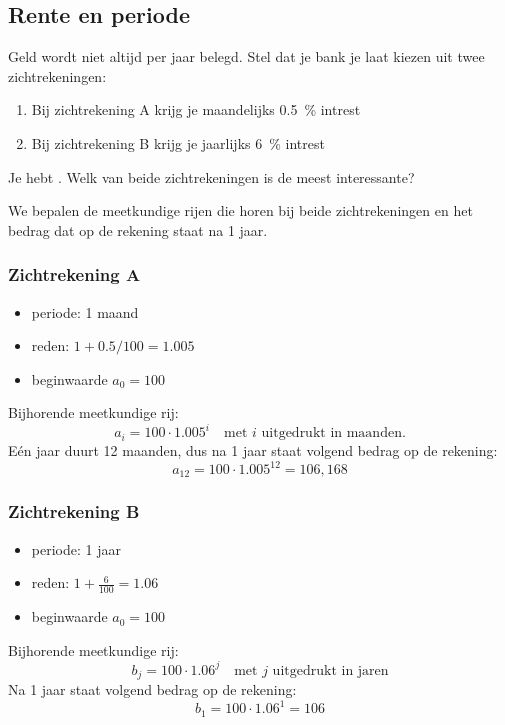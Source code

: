 \subsection{Rente en periode}
Geld wordt niet altijd per jaar belegd. Stel dat je bank je laat kiezen uit twee zichtrekeningen:
\begin{enumerate}
\item Bij zichtrekening A krijg je maandelijks \SI{0,5}{\percent} intrest
\item Bij zichtrekening B krijg je jaarlijks \SI{6}{\percent} intrest
\end{enumerate}
Je hebt . Welk van beide zichtrekeningen is de meest interessante?


We bepalen de meetkundige rijen die horen bij beide zichtrekeningen en het  bedrag dat op de rekening staat na 1 jaar.

\subsubsection{Zichtrekening A}
\begin{itemize}
\item periode: 1 maand
\item reden: $1+\num{0.5}/100=\num{1.005}$
\item beginwaarde $a_0=100$
\end{itemize}
Bijhorende meetkundige rij:
\begin{equation}
a_i=100\cdot \num{1.005}^i \quad \text{met~}i\text{~uitgedrukt~in~maanden.}
\end{equation}
E\'en jaar duurt 12 maanden, dus na 1 jaar staat volgend bedrag op de rekening:
\[
a_{12}=100\cdot \num{1.005}^{12}=106,168
\]


\subsubsection{Zichtrekening B}
\begin{itemize}
\item periode: 1 jaar
\item reden: $1+\frac{6}{100}=1.06$
\item beginwaarde $a_0=100$
\end{itemize}
Bijhorende meetkundige rij:
\begin{equation}
b_j=100\cdot \num{1.06}^j \quad \text{met~}j\text{~uitgedrukt~in~jaren}
\end{equation}
Na 1 jaar staat volgend bedrag op de rekening:
\[
b_1=100\cdot \num{1.06}^1=106
\]

